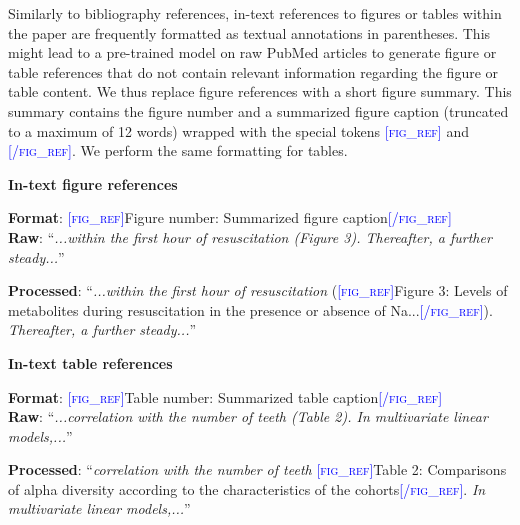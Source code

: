 \documentclass{article}
\begin{document}
Similarly to bibliography references, in-text references to figures or tables within the paper are frequently formatted as textual annotations in parentheses. This might lead to a pre-trained model on raw PubMed articles to generate figure or table references that do not contain relevant information regarding the figure or table content. We thus replace figure references with a short figure summary. This summary contains the figure number and a summarized figure caption (truncated to a maximum of 12 words) wrapped with the special tokens \textsc{\textcolor{blue}{[fig\_ref]}} and \textsc{\textcolor{blue}{[/fig\_ref]}}. We perform the same formatting for tables. 

\begin{myboxnote}[]
\begin{center}
\textbf{In-text figure references} 
\end{center} 

\textbf{Format}: \textsc{\textcolor{blue}{[fig\_ref]}}{Figure number: Summarized figure caption}\textsc{\textcolor{blue}{[/fig\_ref]}} \\

\textbf{Raw}: “\textit{...within the first hour of resuscitation (Figure 3). Thereafter, a further steady...}”

\textbf{Processed}: “\textit{...within the first hour of resuscitation} (\textsc{\textcolor{blue}{[fig\_ref]}}Figure 3: Levels of metabolites during resuscitation in the presence or absence of Na...\textsc{\textcolor{blue}{[/fig\_ref]}}). \textit{Thereafter, a further steady...}”
\end{myboxnote}

\begin{myboxnote}[]
\begin{center}
\textbf{In-text table references} 
\end{center} 

\textbf{Format}: \textsc{\textcolor{blue}{[fig\_ref]}}{Table number: Summarized table caption}\textsc{\textcolor{blue}{[/fig\_ref]}} \\

\textbf{Raw}: “\textit{...correlation with the number of teeth {(Table 2)}. In multivariate linear models,...}”

\textbf{Processed}: “\textit{correlation with the number of teeth} \textsc{\textcolor{blue}{[fig\_ref]}}{Table 2: Comparisons of alpha diversity according to the characteristics of the cohorts}\textsc{\textcolor{blue}{[/fig\_ref]}}. \textit{In multivariate linear models,...}”\\
\end{myboxnote}
\end{document}
